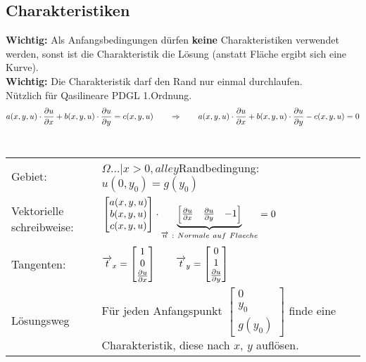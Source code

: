 \subsection{Charakteristiken}
\textbf{Wichtig:} Als Anfangsbedingungen dürfen \textbf{keine} Charakteristiken verwendet werden, sonst ist die Charakteristik die Lösung (anstatt Fläche ergibt sich eine Kurve).\\
\textbf{Wichtig:} Die Charakteristik darf den Rand nur einmal durchlaufen.\\
Nützlich für Qasilineare PDGL 1.Ordnung.\\
$$a(x,y,u)\cdot\frac{\partial u}{\partial x}+b(x,y,u)\cdot\frac{\partial u}{\partial y}=c(x,y,u) \qquad\Rightarrow\qquad a(x,y,u)\cdot\frac{\partial u}{\partial x}+b(x,y,u)\cdot\frac{\partial u}{\partial y}-c(x,y,u)=0$$\\


\begin{tabular}{ll}
Gebiet:& $\Omega{\ldots|x>0,alle y}$\qquad Randbedingung: $u(0,y_0)=g(y_0)$\\
Vektorielle schreibweise:& $\begin{bmatrix}
	a(x,y,u)\\ b(x,y,u)\\ c(x,y,u)
\end{bmatrix}\cdot 
\underset{\overrightarrow{n}~:~Normale ~auf~ Flaeche}{\underbrace{\begin{bmatrix}
\frac{\partial u}{\partial x} & \frac{\partial u}{\partial y} & -1
\end{bmatrix}}}=0$\\[1cm]
Tangenten:& $\overrightarrow{t}_x=\begin{bmatrix}1\\0\\ \frac{\partial u}{\partial x}\end{bmatrix}\qquad 
			\overrightarrow{t}_y=\begin{bmatrix}0\\1\\ \frac{\partial u}{\partial y}\end{bmatrix}$\\[1cm]
Lösungsweg& Für jeden Anfangspunkt $\begin{bmatrix} 0\\y_0\\g(y_0)\end{bmatrix}$ finde eine Charakteristik, diese nach $x$, $y$ auflösen.
\end{tabular}


